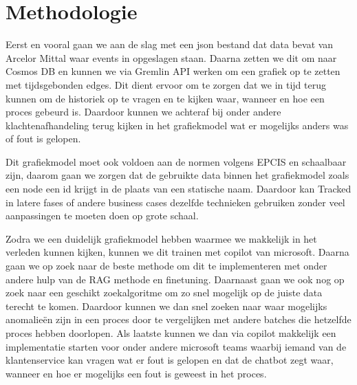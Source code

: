 \section{Methodologie}%
\label{sec:methodologie}
Eerst en vooral gaan we aan de slag met een json bestand dat data bevat van Arcelor Mittal waar events in opgeslagen staan.
Daarna zetten we dit om naar Cosmos DB en kunnen we via Gremlin API werken om een grafiek op te zetten met tijdsgebonden edges. Dit dient ervoor om te zorgen dat we in tijd terug kunnen om de historiek op te vragen en te kijken waar, wanneer en hoe een proces gebeurd is.
Daardoor kunnen we achteraf bij onder andere klachtenafhandeling terug kijken in het grafiekmodel wat er mogelijks anders was of fout is gelopen.

Dit grafiekmodel moet ook voldoen aan de normen volgens EPCIS en schaalbaar zijn, daarom gaan we zorgen dat de gebruikte data binnen het grafiekmodel zoals een node een id krijgt in de plaats van een statische naam.
Daardoor kan Tracked in latere fases of andere business cases dezelfde technieken gebruiken zonder veel aanpassingen te moeten doen op grote schaal.

Zodra we een duidelijk grafiekmodel hebben waarmee we makkelijk in het verleden kunnen kijken, kunnen we dit trainen met copilot van microsoft.
Daarna gaan we op zoek naar de beste methode om dit te implementeren met onder andere hulp van de RAG methode en finetuning. Daarnaast gaan we ook nog op zoek naar een geschikt zoekalgoritme om zo snel mogelijk op de juiste data terecht te komen.
Daardoor kunnen we dan snel zoeken naar waar mogelijks anomalieën zijn in een proces door te vergelijken met andere batches die hetzelfde proces hebben doorlopen.
Als laatste kunnen we dan via copilot makkelijk een implementatie starten voor onder andere microsoft teams waarbij iemand van de klantenservice kan vragen wat er fout is gelopen en dat de chatbot zegt waar, wanneer en hoe er mogelijks een fout is geweest in het proces.


